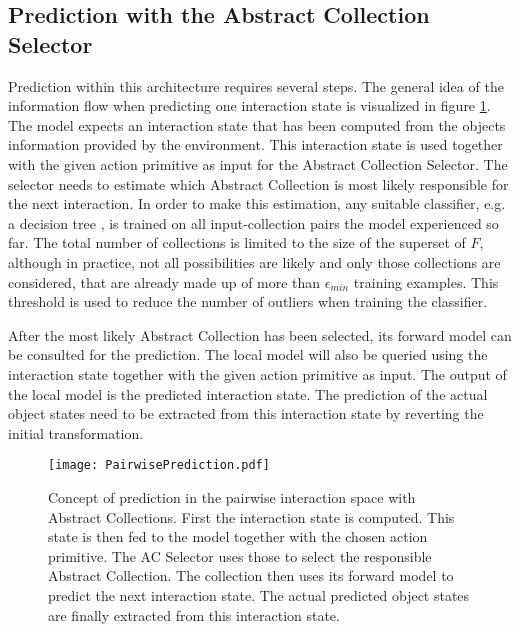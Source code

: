 
\subsection{Prediction with the Abstract Collection Selector \label{sec:pairPrediction}}
Prediction within this architecture requires several steps. The general idea of the information flow when predicting one interaction state is visualized in figure \ref{fig:PairPrediction}. The model expects an interaction state that has been computed from the objects information provided by the environment. This interaction state is used together with the given action primitive as input for the Abstract Collection Selector. The selector needs to estimate which Abstract Collection is most likely responsible for the next interaction. In order to make this estimation, any suitable classifier, e.g. a decision tree \cite{DT}, is trained on all input-collection pairs the model experienced so far. 
The total number of collections is limited to the size of the superset of $F$, although in practice, not all possibilities are likely and only those collections are considered, that are already made up of more than $\epsilon_{min}$ training examples. This threshold is used to reduce the number of outliers when training the classifier. %

After the most likely Abstract Collection has been selected, its forward model can be consulted for the prediction. The local model will also be queried using the interaction state together with the given action primitive as input. The output of the local model is the predicted interaction state. The prediction of the actual object states need to be extracted from this interaction state by reverting the initial transformation.

\begin{figure}
	\centering
	\texttt{[image: PairwisePrediction.pdf]}
	\caption{Concept of prediction in the pairwise interaction space with Abstract Collections. First the interaction state is computed. This state is then fed to the model together with the chosen action primitive. The AC Selector uses those to select the responsible Abstract Collection. The collection then uses its forward model to predict the next interaction state. The actual predicted object states are finally extracted from this interaction state.} 
	\label{fig:PairPrediction}
\end{figure}

